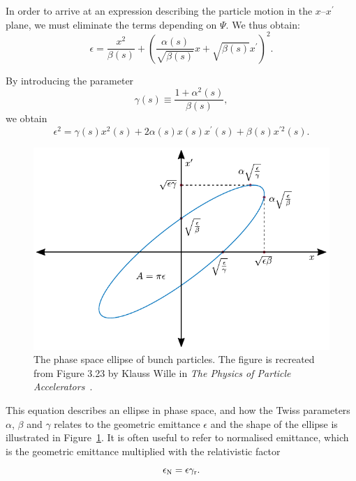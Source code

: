 In order to arrive at an expression describing the particle motion in the $x$--$x^\prime$ plane, we must eliminate the terms depending on $\Psi$.
We thus obtain:
\begin{equation}
    \epsilon = \frac{x^2}{\beta(s)} + \left(\frac{\alpha(s)}{\sqrt{\beta(s)}}x + \sqrt{\beta(s)}x^{\prime}\right)^2.
\end{equation}

By introducing the parameter
\begin{equation}
    \gamma(s) \equiv \frac{1+\alpha^2(s)}{\beta(s)}, \label{EQ:TwissGamma}
\end{equation}
we obtain
\begin{equation}
    \epsilon^2 = \gamma(s)x^2(s) + 2\alpha(s)x(s)x^{\prime}(s) + \beta(s)x^{\prime 2}(s). \label{EQ:EmittFull}
\end{equation}

\begin{figure}[hbt]
    \centering
    \includegraphics[width=0.8\linewidth]{figures/Twiss}
    \caption{\label{Fig:BPI:Twiss}
        The phase space ellipse of bunch particles.
        The figure is recreated from Figure 3.23 by Klauss Wille in \textit{The Physics of Particle Accelerators}~\cite{wille:2001}.
    }
\end{figure}

This equation describes an ellipse in phase space, and how the Twiss parameters $\alpha$, $\beta$ and $\gamma$ relates to the geometric emittance $\epsilon$ and the shape of the ellipse is illustrated in Figure~\ref{Fig:BPI:Twiss}.
It is often useful to refer to normalised emittance, which is the geometric emittance multiplied with the relativistic factor
\begin{equation}
    \epsilon_{\mathrm{N}} = \epsilon \gamma_{\mathrm{r}}.
\end{equation}

